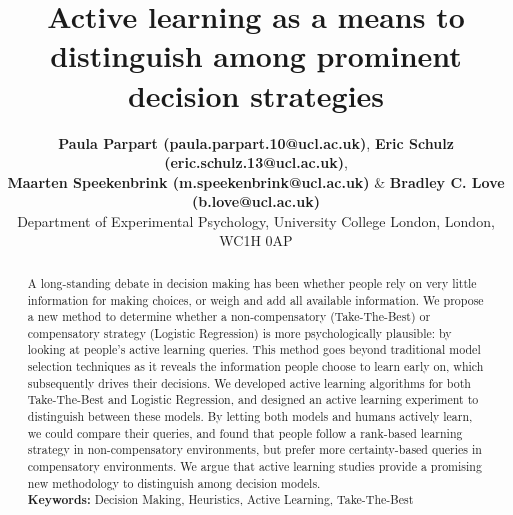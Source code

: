 \documentclass[10pt,letterpaper]{article}
\title{Active learning as a means to distinguish among prominent decision strategies}
\author{{\large \bf Paula Parpart (paula.parpart.10@ucl.ac.uk)}, {\large \bf Eric Schulz (eric.schulz.13@ucl.ac.uk)}, \\{\large \bf Maarten Speekenbrink (m.speekenbrink@ucl.ac.uk)} \& {\large \bf Bradley C. Love (b.love@ucl.ac.uk)}\medskip\\
Department of Experimental Psychology, University College London, London, WC1H 0AP}
\begin{document}
\maketitle

\begin{abstract}
A long-standing debate in decision making has been whether people rely on very little information for making choices, or weigh and add all available information. We propose a new method to determine whether a non-compensatory (Take-The-Best) or compensatory strategy (Logistic Regression) is more psychologically plausible: by looking at people’s active learning queries. This method goes beyond traditional model selection techniques as it reveals the information people choose to learn early on, which subsequently drives their decisions.  We developed active learning algorithms for both Take-The-Best and Logistic Regression, and designed an active learning experiment to distinguish between these models. By letting both models and humans actively learn, we could compare their queries, and found that people follow a rank-based learning strategy in non-compensatory environments, but prefer more certainty-based queries in compensatory environments. We argue that active learning studies provide a promising new methodology to distinguish among decision models.\\ 
\textbf{Keywords:} 
Decision Making, Heuristics, Active Learning, Take-The-Best
\end{abstract}
\end{document}
